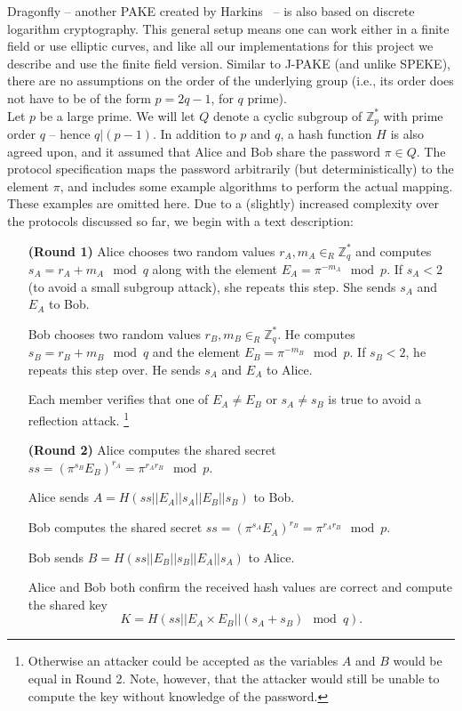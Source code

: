 
Dragonfly -- another PAKE created by Harkins~\cite{Ha15} -- is also based on discrete logarithm cryptography.  This general setup means one can work  either in a finite field or use elliptic curves, and like all our implementations for this project we describe and use the finite field version. 
Similar to J-PAKE (and unlike SPEKE), there are no assumptions on the order of the underlying group (i.e., its order does not have to be of the
form $p = 2q-1$, for $q$ prime).
\\

Let $p$ be a large prime. We will let $Q$ denote a cyclic subgroup of $\mathbb{Z}_p^*$ with prime order $q$ -- hence $q | (p-1)$. In addition to $p$ and $q$, a hash function $H$ is also agreed upon, and it assumed that Alice and Bob share the password $\pi \in Q$. The protocol specification maps the password
arbitrarily (but deterministically) to the element $\pi$, and includes some example algorithms to perform the actual mapping. These examples are omitted here. Due to a (slightly) increased complexity over the protocols discussed so far, we begin with a text description:

\begin{itemize}
    \item[\textbf{(Round 1)}] Alice chooses two random values $r_A, m_A \in_R \mathbb{Z}_q^*$ and computes $s_A = r_A + m_A \mod q$ along with the element
        $E_A = \pi^{-m_A} \mod p$. If $s_A < 2$ (to avoid a small subgroup attack), she repeats this step. She sends $s_A$ and $E_A$ to Bob.
        \label{enum:dragonfly2}
    \item[]
    \item[] Bob chooses two random values $r_B, m_B \in_R \mathbb{Z}_q^*$. He computes $s_B = r_B + m_B \mod q$ and the element
        $E_B = \pi^{-m_B} \mod p$. If $s_B < 2$, he repeats this step over. He sends $s_A$ and $E_A$ to Alice.
        \label{enum:dragonfly3}
    \item[]
    \item[] Each member verifies that one of $E_A \neq E_B$ or $s_A \neq s_B$ is true to avoid a reflection attack.
        \footnote{Otherwise an attacker could be accepted as the variables $A$ and $B$ would be equal in Round 2. Note, however, that the attacker would still be unable to compute the key without knowledge of the password.}
    \item[]
    \item[\textbf{(Round 2)}] Alice computes the shared secret $ss = (\pi^{s_B} E_B)^{r_A} = \pi^{r_A r_B} \mod p$. 
    \item[] Alice sends $A = H(ss || E_A || s_A || E_B || s_B)$ to Bob.
    \item[]
    \item[] Bob computes the shared secret $ss = (\pi^{s_A} E_A)^{r_B} = \pi^{r_A r_B} \mod p$. 
    \item[] Bob sends $B = H(ss || E_B || s_B || E_A || s_A)$ to Alice.
    \item[]
    \item[] Alice and Bob both confirm the received hash values are correct and compute the shared key 
    \[ K = H(ss || E_A \times E_B || (s_A + s_B) \mod q).\]
\end{itemize}

